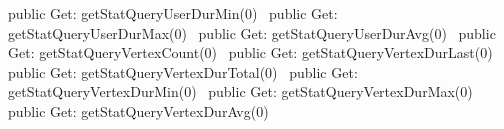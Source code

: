 public \LA{}Get: getStatQueryUserDurMin(0)~{\nwtagstyle{}}\RA{}
public \LA{}Get: getStatQueryUserDurMax(0)~{\nwtagstyle{}}\RA{}
public \LA{}Get: getStatQueryUserDurAvg(0)~{\nwtagstyle{}}\RA{}
public \LA{}Get: getStatQueryVertexCount(0)~{\nwtagstyle{}}\RA{}
public \LA{}Get: getStatQueryVertexDurLast(0)~{\nwtagstyle{}}\RA{}
public \LA{}Get: getStatQueryVertexDurTotal(0)~{\nwtagstyle{}}\RA{}
public \LA{}Get: getStatQueryVertexDurMin(0)~{\nwtagstyle{}}\RA{}
public \LA{}Get: getStatQueryVertexDurMax(0)~{\nwtagstyle{}}\RA{}
public \LA{}Get: getStatQueryVertexDurAvg(0)~{\nwtagstyle{}}\RA{}
\nwendcode{}\nwdocspar

